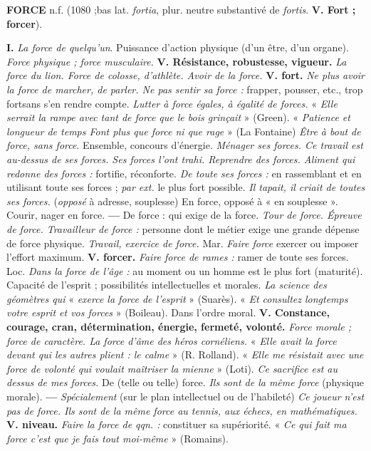 {\bf FORCE} {\sf n.f.} (1080 ;bas lat. {\it fortia}, plur. neutre substantivé de {\it fortis}. {\bf V. Fort ; forcer}).

{\bf I.} {\it La force de quelqu'un}.  Puissance d'action physique (d'un être, d'un organe). {\it Force physique ; force musculaire.} {\bf V. Résistance, robustesse, vigueur.} {\it La force du lion. Force de colosse, d'athlète. Avoir de la force.} {\bf V. fort.} {\it Ne plus avoir la force de marcher, de parler. Ne pas sentir sa force :} frapper, pousser, etc., trop fortsans s'en rendre compte. {\it Lutter à force égales, à égalité de forces.} « {\it Elle serrait la rampe avec tant de force que le bois grinçait} » ({\sc Green}). « {\it Patience et longueur de temps Font plus que force ni que rage} » ({\sc La Fontaine}) {\it Être à bout de force, sans force}.  Ensemble, concours d'énergie. {\it Ménager ses forces. Ce travail est au-dessus de ses forces. Ses forces l'ont trahi. Reprendre des forces. Aliment qui redonne des forces :} fortifie, réconforte. {\it De toute ses forces :} en rassemblant et en utilisant toute ses forces ; {\it par ext.} le plus fort possible. {\it Il tapait, il criait de toutes ses forces.} \lb ({\it opposé} à adresse, souplesse) {\sc En force}, opposé à « en souplesse ». Courir, nager en force. {\bf —} {\sc De force} : qui exige de la force. {\it Tour de force. Épreuve de force. Travailleur de force :} personne dont le métier exige une grande dépense de force physique. {\it Travail, exercice de force.} \lb Mar. {\it Faire force} exercer ou imposer l'effort maximum. {\bf V. forcer.} {\it Faire force de rames :} ramer de toute ses forces. \lb Loc. {\it Dans la force de l'âge :} au moment ou un homme est le plus fort (maturité).  Capacité de l'esprit ; possibilités intellectuelles et morales. {\it La science des géomètres qui } « {\it exerce la force de l'esprit} » ({\sc Suarès}). « {\it Et consultez longtemps votre esprit et vos forces} » ({\sc Boileau}). Dans l'ordre moral. {\bf V. Constance, courage, cran, détermination, énergie, fermeté, volonté.} {\it Force morale ; force de caractère. La force d'âme des héros cornéliens.} « {\it Elle avait la force devant qui les autres plient : le calme} » ({\sc R. Rolland}). « {\it Elle me résistait avec une force de volonté qui voulait maîtriser la mienne} » ({\sc Loti}). {\it Ce sacrifice est au dessus de mes forces.}   {\sc De} (telle ou telle) {\sc force.} {\it Ils sont de la même force} (physique morale). {\bf —} {\it Spécialement} (sur le plan intellectuel ou de l'habileté) {\it Ce joueur n'est pas de force. Ils sont de la même force au tennis, aux échecs, en mathématiques.} {\bf V. niveau.}  {\it Faire la force de qqn. :} constituer sa supériorité. « {\it Ce qui fait ma force c'est que je fais tout moi-même} » ({\sc Romains}).

